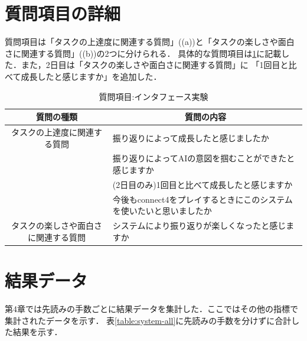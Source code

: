 \section{質問項目の詳細}
質問項目は「タスクの上達度に関連する質問」((a))と「タスクの楽しさや面白さに関連する質問」((b))の2つに分けられる．
具体的な質問項目は\ref{table:query}に記載した．また，2日目は「タスクの楽しさや面白さに関連する質問」に
「1回目と比べて成長したと感じますか」を追加した．
\begin{table}[H]
    \caption{質問項目:インタフェース実験}
    \label{table:query}
    \centering
	\scriptsize
    \begin{tabular}{c||l}
        \multicolumn{1}{c|}{質問の種類} & \multicolumn{1}{c}{質問の内容} \\ \hline \hline
        タスクの上達度に関連する質問 & 振り返りによって成長したと感じましたか \\
		\multicolumn{1}{c||}{}&振り返りによってAIの意図を掴むことができたと感じますか \\
		\multicolumn{1}{c||}{} & (2日目のみ)1回目と比べて成長したと感じますか\\\hline
        \multicolumn{1}{c||}{} & 今後もconnect4をプレイするときにこのシステムを使いたいと思いましたか \\
        タスクの楽しさや面白さに関連する質問 & システムにより振り返りが楽しくなったと感じますか\\
    \end{tabular}
    
\end{table}
\section{結果データ}
第4章では先読みの手数ごとに結果データを集計した．ここではその他の指標で集計されたデータを示す．
表\ref{table:system-all}に先読みの手数を分けずに合計した結果を示す．
\begin{table}[H]
    \caption{結果:総合}
    \label{table:system-all}
    \scriptsize
    \centering
    
\end{table}

